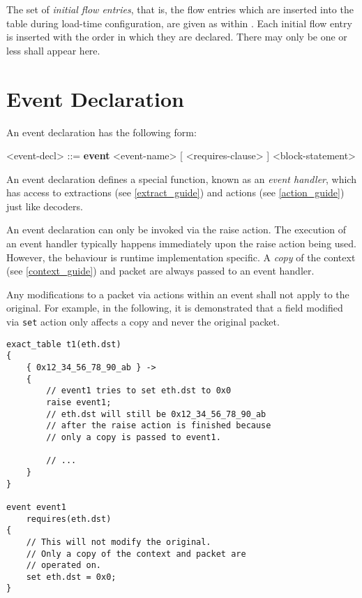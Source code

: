 The set of \textit{initial flow entries}, that is, the flow entries which are inserted into the table during load-time configuration, are given as  within . Each initial flow entry is inserted with the order in which they are declared. There may only be one or less  shall appear here.

\section{Event Declaration} \label{event_guide}

An event declaration has the following form:

\begin{minip}
\begin{grammar}
<event-decl> ::=
\textbf{event} <event-name> [ <requires-clause> ]
<block-statement>
\end{grammar}
\end{minip}

An event declaration defines a special function, known as an \textit{event handler}, which has access to extractions (see \ref{extract_guide}) and actions (see \ref{action_guide}) just like decoders. 

An event declaration can only be invoked via the raise action. The execution of an event handler typically happens immediately upon the raise action being used. However, the behaviour is runtime implementation specific. A \textit{copy} of the context (see \ref{context_guide}) and packet are always passed to an event handler. 

Any modifications to a packet via actions within an event shall not apply to the original. For example, in the following, it is demonstrated that a field modified via \texttt{set} action only affects a copy and never the original packet.

\begin{minip}
\begin{lstlisting}
exact_table t1(eth.dst)
{
	{ 0x12_34_56_78_90_ab } ->
	{
		// event1 tries to set eth.dst to 0x0
		raise event1;
		// eth.dst will still be 0x12_34_56_78_90_ab
		// after the raise action is finished because
		// only a copy is passed to event1.
		
		// ...
	}
}

event event1
	requires(eth.dst)
{
	// This will not modify the original.
	// Only a copy of the context and packet are
	// operated on.
	set eth.dst = 0x0;
}
\end{lstlisting}
\end{minip}

